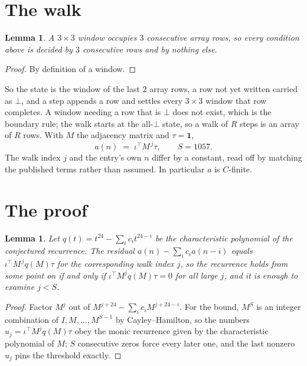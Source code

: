 \documentclass[11pt,a4paper]{article}
\theoremstyle{plain}
\newtheorem{lemma}[theorem]{Lemma}
\theoremstyle{definition}
\begin{document}
\section{The walk}

\begin{lemma}\label{lem:win}
A $3\times3$ window occupies $3$ consecutive array rows, so every condition above is
decided by $3$ consecutive rows and by nothing else.
\end{lemma}

\begin{proof}
By definition of a window.
\end{proof}

So the state is the window of the last $2$ array rows, a row not yet written carried as
$\bot$, and a step appends a row and settles every $3\times3$ window that row completes. A
window needing a row that is $\bot$ does not exist, which is the boundary rule; the walk starts
at the all-$\bot$ state, so a walk of $R$ steps is an array of $R$ rows. With $M$ the adjacency
matrix and $\tau=\mathbf{1}$,
\[
a(n)\;=\;\iota^{\!\top}M^{\,j}\tau ,\qquad S=1057.
\]
The walk index $j$ and the entry's own $n$ differ by a constant, read off by matching the
published terms rather than assumed. In particular $a$ is $C$-finite.

\section{The proof}

\begin{lemma}\label{lem:crit}
Let $q(t)=t^{24}-\sum_i c_it^{24-i}$ be the characteristic polynomial of the
conjectured recurrence. The residual $a(n)-\sum_ic_ia(n-i)$ equals
$\iota^{\!\top}M^{\,j}q(M)\tau$ for the corresponding walk index $j$, so the recurrence
holds from some point on if and only if $\iota^{\!\top}M^{j}q(M)\tau=0$ for all large $j$,
and it is enough to examine $j<S$.
\end{lemma}

\begin{proof}
Factor $M^{j}$ out of $M^{j+24}-\sum_ic_iM^{j+24-i}$. For the bound, $M^{S}$
is an integer combination of $I,M,\dots,M^{S-1}$ by Cayley--Hamilton, so the numbers
$u_j=\iota^{\!\top}M^{j}q(M)\tau$ obey the monic recurrence given by the characteristic
polynomial of $M$; $S$ consecutive zeros force every later one, and the last nonzero $u_j$
pins the threshold exactly.
\end{proof}
\end{document}
